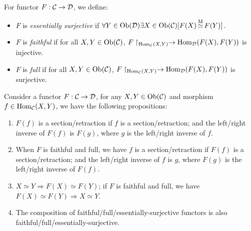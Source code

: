 \documentclass{article}
\begin{document}
\begin{defi}\label{different functors}
	For functor $F:\mathcal{C}\to\mathcal{D}$, we define:
	\begin{itemize}
		\item $F$ is \emph{essentially surjective} if $\forall Y\in\mathrm{Ob}(\mathcal{D})\exists X\in\mathrm{Ob}(\mathcal{C})[F(X)\mathop{\simeq}\limits^\mathrm{M}F(Y)]$.
		\item $F$ is \emph{faithful} if for all $X,Y\in\mathrm{Ob}(\mathcal{C})$, $F\upharpoonright_{\mathrm{Hom}_{\mathcal{C}}(X,Y)}\to\mathrm{Hom}_{\mathcal{D}}(F(X),F(Y))$ is injective.
		\item $F$ is \emph{full} if for all $X,Y\in\mathrm{Ob}(\mathcal{C})$, $F\upharpoonright_{\mathrm{Hom}_{\mathcal{C}}(X,Y)}\to\mathrm{Hom}_{\mathcal{D}}(F(X),F(Y))$ is surjective.
	\end{itemize}
\end{defi}


\begin{lmm}\label{func ppt}
	Consider a functor $F:\mathcal{C}\to\mathcal{D}$, for any $X,Y\in\mathrm{Ob}(\mathcal{C})$ and morphism $f\in\mathrm{Hom}_{\mathcal{C}}(X,Y)$, we have the following propositions:
	\begin{enumerate}
		\item $F(f)$ is a section/retraction if $f$ is a section/retraction; and the left/right inverse of $F(f)$ is $F(g)$, where $g$ is the left/right inverse of $f$.
		\item When $F$ is faithful and full, we have $f$ is a section/retraction if $F(f)$ is a section/retraction; and the left/right inverse of $f$ is $g$, where $F(g)$ is the left/right inverse of $F(f)$.
		\item $X\simeq Y\Longrightarrow F(X)\simeq F(Y)$; if $F$ is faithful and full, we have $F(X)\simeq F(Y)\Longrightarrow X\simeq Y$.
		\item The composition of faithful/full/essentially-surjective functors is also faithful/full/essentially-surjective.
	\end{enumerate}
\end{lmm}
\end{document}
